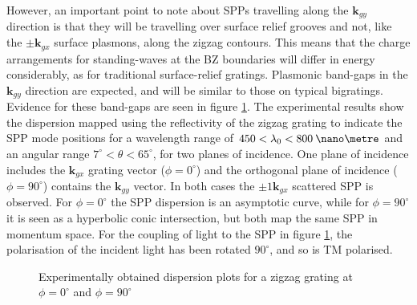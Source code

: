 However, an important point to note about SPPs travelling along the $\mathbf{k}_{gy}$ direction is that they will be travelling over surface relief grooves and not, like the $\pm\mathbf{k}_{gx}$ surface plasmons, along the zigzag contours. This means that the charge arrangements for standing-waves at the BZ boundaries will differ in energy considerably, as for traditional surface-relief gratings. Plasmonic band-gaps in the $\mathbf{k}_{gy}$ direction are expected, and will be similar to those on typical bigratings. Evidence for these band-gaps are seen in figure \ref{fig:anisotropic-dispersion-diagrams}. The experimental results show the dispersion mapped using the reflectivity of the zigzag grating to indicate the SPP mode positions for a wavelength range of $450<\lambda_0<800\:\nano\metre$ and an angular range $7^\circ<\theta<65^\circ$, for two planes of incidence. One plane of incidence includes the $\mathbf{k}_{gx}$ grating vector ($\phi=0^\circ$) and the orthogonal plane of incidence ($\phi=90^\circ$) contains the $\mathbf{k}_{gy}$ vector. In both cases the $\pm 1\mathbf{k}_{gx}$ scattered SPP is observed. For $\phi=0^\circ$ the SPP dispersion is an asymptotic curve, while for $\phi=90^\circ$ it is seen as a hyperbolic conic intersection, but both map the same SPP in momentum space. For the coupling of light to the SPP in figure \ref{fig:anisotropic-dispersion-diagrams}, the polarisation of the incident light has been rotated $90^\circ$, and so is TM polarised.

\begin{figure}
	\begin{center}
		\caption{Experimentally obtained dispersion plots for a zigzag grating at $\phi=0^\circ$ and $\phi=90^\circ$\label{fig:anisotropic-dispersion-diagrams}}
	\end{center}
\end{figure}

